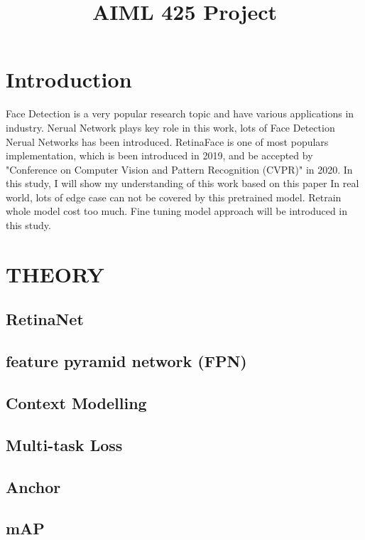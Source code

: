 \documentclass{article}
\title{AIML 425 Project}
\begin{document}
%
\maketitle
%
\section{Introduction}
\label{sec:intro}

Face Detection is a very popular research topic and have various applications in industry.
Nerual Network plays key role in this work, lots of Face Detection Nerual Networks has been introduced.
RetinaFace is one of most populars implementation, which is been introduced in 2019, 
and be accepted by "Conference on Computer Vision and Pattern Recognition (CVPR)" in 2020.
In this study, I will show my understanding of this work based on this paper \cite{deng2020retinaface}
In real world, lots of edge case can not be covered by this pretrained model.
Retrain whole model cost too much.
Fine tuning model approach will be introduced in this study.


\section{THEORY}
\label{sec:theory}

\subsection{RetinaNet}

\subsection{feature pyramid network (FPN)}

\subsection{Context Modelling}

\subsection{Multi-task Loss}

\subsection{Anchor}

\subsection{mAP}
\end{document}
